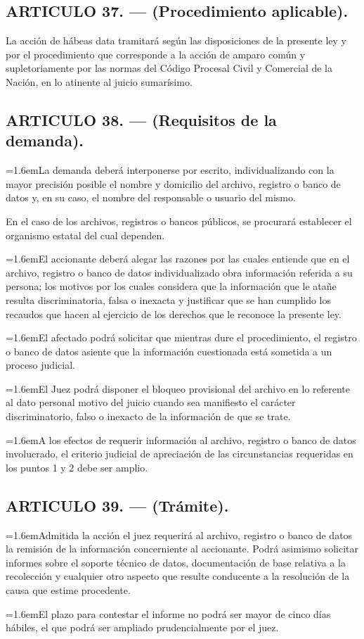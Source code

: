 \documentclass[10pt,a4paper]{article}
\newcommand{\articulo}[1]{\subsection{#1}}
\newcommand{\inciso}[2]{\par{\hangindent=1.6em\hangafter=1\makebox[1.6em][l]{#1}#2\par}}
\begin{document}
\articulo{ARTICULO 37. — (Procedimiento aplicable).}
La acción de hábeas data tramitará según las disposiciones de la presente ley y por el procedimiento que corresponde a la acción de amparo común y supletoriamente por las normas del Código Procesal Civil y Comercial de la Nación, en lo atinente al juicio sumarísimo.

\articulo{ARTICULO 38. — (Requisitos de la demanda).}
\inciso{1.}{La demanda deberá interponerse por escrito, individualizando con la mayor precisión posible el nombre y domicilio del archivo, registro o banco de datos y, en su caso, el nombre del responsable o usuario del mismo.}

En el caso de los archivos, registros o bancos públicos, se procurará establecer el organismo estatal del cual dependen.

\inciso{2.}{El accionante deberá alegar las razones por las cuales entiende que en el archivo, registro o banco de datos individualizado obra información referida a su persona; los motivos por los cuales considera que la información que le atañe resulta discriminatoria, falsa o inexacta y justificar que se han cumplido los recaudos que hacen al ejercicio de los derechos que le reconoce la presente ley.}

\inciso{3.}{El afectado podrá solicitar que mientras dure el procedimiento, el registro o banco de datos asiente que la información cuestionada está sometida a un proceso judicial.}

\inciso{4.}{El Juez podrá disponer el bloqueo provisional del archivo en lo referente al dato personal motivo del juicio cuando sea manifiesto el carácter discriminatorio, falso o inexacto de la información de que se trate.}

\inciso{5.}{A los efectos de requerir información al archivo, registro o banco de datos involucrado, el criterio judicial de apreciación de las circunstancias requeridas en los puntos 1 y 2 debe ser amplio.}

\articulo{ARTICULO 39. — (Trámite).}
\inciso{1.}{Admitida la acción el juez requerirá al archivo, registro o banco de datos la remisión de la información concerniente al accionante. Podrá asimismo solicitar informes sobre el soporte técnico de datos, documentación de base relativa a la recolección y cualquier otro aspecto que resulte conducente a la resolución de la causa que estime procedente.}

\inciso{2.}{El plazo para contestar el informe no podrá ser mayor de cinco días hábiles, el que podrá ser ampliado prudencialmente por el juez.}
\end{document}
